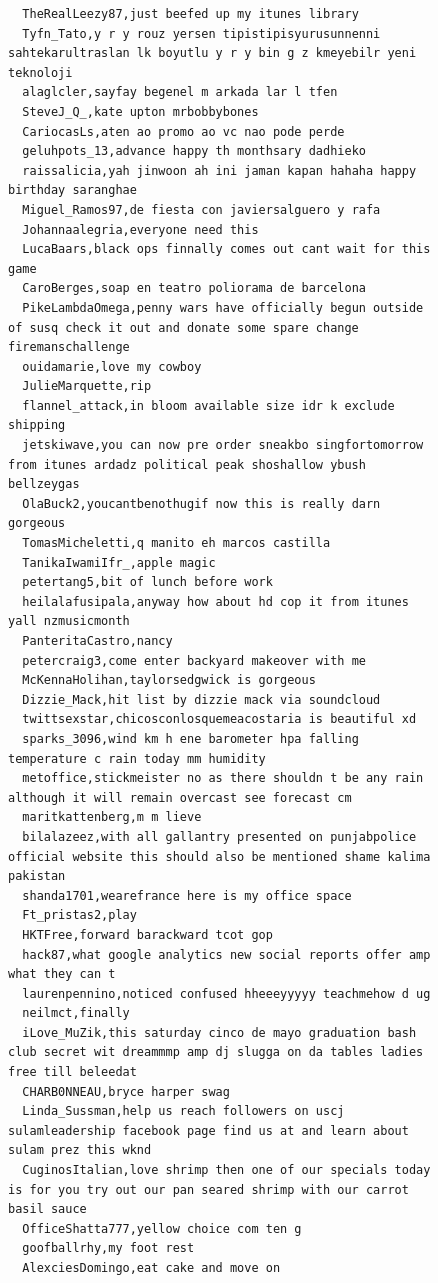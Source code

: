 \begin{figure}[htpb]
\begin{verbatim}
  TheRealLeezy87,just beefed up my itunes library
  Tyfn_Tato,y r y rouz yersen tipistipisyurusunnenni sahtekarultraslan lk boyutlu y r y bin g z kmeyebilr yeni teknoloji
  alaglcler,sayfay begenel m arkada lar l tfen
  SteveJ_Q_,kate upton mrbobbybones
  CariocasLs,aten ao promo ao vc nao pode perde
  geluhpots_13,advance happy th monthsary dadhieko
  raissalicia,yah jinwoon ah ini jaman kapan hahaha happy birthday saranghae
  Miguel_Ramos97,de fiesta con javiersalguero y rafa
  Johannaalegria,everyone need this
  LucaBaars,black ops finnally comes out cant wait for this game
  CaroBerges,soap en teatro poliorama de barcelona
  PikeLambdaOmega,penny wars have officially begun outside of susq check it out and donate some spare change firemanschallenge
  ouidamarie,love my cowboy
  JulieMarquette,rip
  flannel_attack,in bloom available size idr k exclude shipping
  jetskiwave,you can now pre order sneakbo singfortomorrow from itunes ardadz political peak shoshallow ybush bellzeygas
  OlaBuck2,youcantbenothugif now this is really darn gorgeous
  TomasMicheletti,q manito eh marcos castilla
  TanikaIwamiIfr_,apple magic
  petertang5,bit of lunch before work
  heilalafusipala,anyway how about hd cop it from itunes yall nzmusicmonth
  PanteritaCastro,nancy
  petercraig3,come enter backyard makeover with me
  McKennaHolihan,taylorsedgwick is gorgeous
  Dizzie_Mack,hit list by dizzie mack via soundcloud
  twittsexstar,chicosconlosquemeacostaria is beautiful xd
  sparks_3096,wind km h ene barometer hpa falling temperature c rain today mm humidity
  metoffice,stickmeister no as there shouldn t be any rain although it will remain overcast see forecast cm
  maritkattenberg,m m lieve
  bilalazeez,with all gallantry presented on punjabpolice official website this should also be mentioned shame kalima pakistan
  shanda1701,wearefrance here is my office space
  Ft_pristas2,play
  HKTFree,forward barackward tcot gop
  hack87,what google analytics new social reports offer amp what they can t
  laurenpennino,noticed confused hheeeyyyyy teachmehow d ug
  neilmct,finally
  iLove_MuZik,this saturday cinco de mayo graduation bash club secret wit dreammmp amp dj slugga on da tables ladies free till beleedat
  CHARB0NNEAU,bryce harper swag
  Linda_Sussman,help us reach followers on uscj sulamleadership facebook page find us at and learn about sulam prez this wknd
  CuginosItalian,love shrimp then one of our specials today is for you try out our pan seared shrimp with our carrot basil sauce
  OfficeShatta777,yellow choice com ten g
  goofballrhy,my foot rest
  AlexciesDomingo,eat cake and move on

\end{verbatim}
\end{figure}
